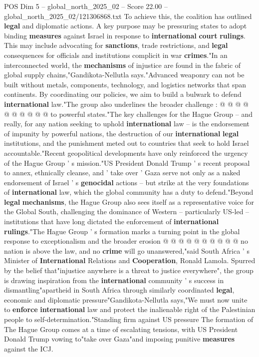 \begin{textsample}{POS Dim 5 – global\_north\_2025\_02 – Score 22.00 – global\_north\_2025\_02/121306868.txt}
To achieve this, the coalition has outlined \textbf{legal} and diplomatic actions.
A key purpose may be pressuring states to adopt binding \textbf{measures} against Israel in response to \textbf{international} \textbf{court} \textbf{rulings}.
This may include advocating for \textbf{sanctions}, trade restrictions, and \textbf{legal} consequences for officials and institutions complicit in war \textbf{crimes}."In an interconnected world, the \textbf{mechanisms} of injustice are found in the fabric of global supply chains,"Gandikota-Nellutla says."Advanced weaponry can not be built without metals, components, technology, and logistics networks that span continents.
By coordinating our policies, we aim to build a bulwark to defend \textbf{international} law."The group also underlines the broader challenge : @ @ @ @ @ @ @ @ @ @ to powerful states."The key challenges for the Hague Group -- and really, for any nation seeking to uphold \textbf{international} law -- is the endorsement of impunity by powerful nations, the destruction of our \textbf{international} \textbf{legal} institutions, and the punishment meted out to countries that seek to hold Israel accountable."Recent geopolitical developments have only reinforced the urgency of the Hague Group ' s mission."US President Donald Trump ' s recent proposal to annex, ethnically cleanse, and ' take over ' Gaza serve not only as a naked endorsement of Israel ' s \textbf{genocidal} actions -- but strike at the very foundations of \textbf{international} law, which the global community has a duty to defend."Beyond \textbf{legal} \textbf{mechanisms}, the Hague Group also sees itself as a representative voice for the Global South, challenging the dominance of Western -- particularly US-led -- institutions that have long dictated the enforcement of \textbf{international} \textbf{rulings}."The Hague Group ' s formation marks a turning point in the global response to exceptionalism and the broader erosion @ @ @ @ @ @ @ @ @ @ no nation is above the law, and no \textbf{crime} will go unanswered,"said South Africa ' s Minister of \textbf{International} Relations and \textbf{Cooperation}, Ronald Lamola.
Spurred by the belief that"injustice anywhere is a threat to justice everywhere", the group is drawing inspiration from the \textbf{international} community ' s success in dismantling"apartheid in South Africa through similarly coordinated \textbf{legal}, economic and diplomatic pressure"Gandikota-Nellutla says,"We must now unite to \textbf{enforce} \textbf{international} law and protect the inalienable right of the Palestinian people to self-determination."Standing firm against US pressure The formation of The Hague Group comes at a time of escalating tensions, with US President Donald Trump vowing to"take over Gaza"and imposing punitive \textbf{measures} against the ICJ.

\end{textsample}
